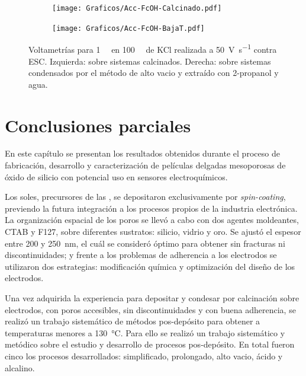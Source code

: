       		\begin{figure}[ht!]
		 	\begin{subfigure}[t]{0.5\textwidth}
		          	\texttt{[image: Graficos/Acc-FcOH-Calcinado.pdf]}
		          	\end{subfigure}
		    \begin{subfigure}[t]{0.5\textwidth}
		          	\texttt{[image: Graficos/Acc-FcOH-BajaT.pdf]}
		         	\end{subfigure}
		         	\caption[Voltagrama comparativo SF calcinados/alto vacío II]{Voltametrías para \fc\space \SI{1}{\milli\Molar} en \SI{100}{\milli\Molar} de KCl realizada a \SI{50}{\volt\per\second} contra ESC. Izquierda: sobre sistemas \pdmF\space calcinados. Derecha: sobre sistemas \pdmF\space condensados por el método de alto vacio y extraído con 2-propanol y agua.}
		         	\label{fig:fcOH_accesibilidad}
		    \end{figure}     	

\section{Conclusiones parciales}
	
	En este capítulo se presentan los resultados obtenidos durante el proceso de fabricación, desarrollo y caracterización de películas delgadas mesoporosas de óxido de silicio con potencial uso en sensores electroquímicos.
	
	Los soles, precursores de las \pdm, se depositaron exclusivamente por \textit{spin-coating}, previendo la futura integración a los procesos propios de la industria electrónica. La organización espacial de los poros se llevó a cabo con dos agentes moldeantes, CTAB y F127, sobre diferentes sustratos: silicio, vidrio y oro. Se ajustó el espesor entre 200 y \SI{250}{\nm}, el cuál se consideró óptimo para obtener \pdm\space sin fracturas ni discontinuidades; y frente a los problemas de adherencia a los electrodos se utilizaron dos estrategias: modificación química y optimización del diseño de los electrodos. 

	Una vez adquirida la experiencia para depositar y condesar por calcinación \pdm\space sobre electrodos, con poros accesibles, sin discontinuidades y con buena adherencia, se realizó un trabajo sistemático de métodos pos-depósito para obtener \pdm\space a temperaturas menores a \SI{130}{\celsius}. Para ello se realizó un trabajo sistemático y metódico sobre el estudio y desarrollo de procesos pos-depósito. En total fueron cinco los procesos desarrollados: simplificado, prolongado, alto vacio, ácido y alcalino.

